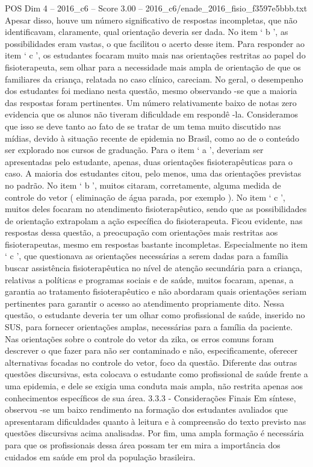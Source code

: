 \begin{textsample}{POS Dim 4 – 2016\_c6 – Score 3.00 – 2016\_c6/enade\_2016\_fisio\_f3597e5bbb.txt}
Apesar disso, houve um número significativo de respostas incompletas, que não identificavam, claramente, qual orientação deveria ser dada.
No item ‘ b ’, as possibilidades eram vastas, o que facilitou o acerto desse item.
Para responder ao item ‘ c ’, os estudantes focaram muito mais nas orientações restritas ao papel do fisioterapeuta, sem olhar para a necessidade mais ampla de orientação de que os familiares da criança, relatada no caso clínico, careciam.
No geral, o desempenho dos estudantes foi mediano nesta questão, mesmo observando -se que a maioria das respostas foram pertinentes.
Um número relativamente baixo de notas zero evidencia que os alunos não tiveram dificuldade em respondê -la.
Consideramos que isso se deve tanto ao fato de se tratar de um tema muito discutido nas mídias, devido à situação recente de epidemia no Brasil, como ao de o conteúdo ser explorado nos cursos de graduação.
Para o item ‘ a ’, deveriam ser apresentadas pelo estudante, apenas, duas orientações fisioterapêuticas para o caso.
A maioria dos estudantes citou, pelo menos, uma das orientações previstas no padrão.
No item ‘ b ’, muitos citaram, corretamente, alguma medida de controle do vetor ( eliminação de água parada, por exemplo ).
No item ‘ c ’, muitos deles focaram no atendimento fisioterapêutico, sendo que as possibilidades de orientação extrapolam a ação específica do fisioterapeuta.
Ficou evidente, nas respostas dessa questão, a preocupação com orientações mais restritas aos fisioterapeutas, mesmo em respostas bastante incompletas.
Especialmente no item ‘ c ’, que questionava as orientações necessárias a serem dadas para a família buscar assistência fisioterapêutica no nível de atenção secundária para a criança, relativas a políticas e programas sociais e de saúde, muitos focaram, apenas, a garantia ao tratamento fisioterapêutico e não abordaram quais orientações seriam pertinentes para garantir o acesso ao atendimento propriamente dito.
Nessa questão, o estudante deveria ter um olhar como profissional de saúde, inserido no SUS, para fornecer orientações amplas, necessárias para a família da paciente.
Nas orientações sobre o controle do vetor da zika, os erros comuns foram descrever o que fazer para não ser contaminado e não, especificamente, oferecer alternativas focadas no controle do vetor, foco da questão.
Diferente das outras questões discursivas, esta colocava o estudante como profissional de saúde frente a uma epidemia, e dele se exigia uma conduta mais ampla, não restrita apenas aos conhecimentos específicos de sua área. 3.3.3 - Considerações Finais Em síntese, observou -se um baixo rendimento na formação dos estudantes avaliados que apresentaram dificuldades quanto à leitura e à compreensão do texto previsto nas questões discursivas acima analisadas.
Por fim, uma ampla formação é necessária para que os profissionais dessa área possam ter em mira a importância dos cuidados em saúde em prol da população brasileira.

\end{textsample}
